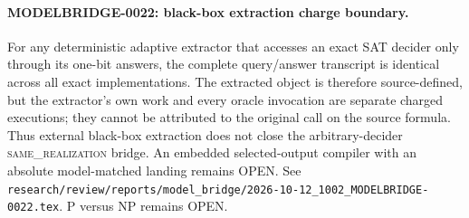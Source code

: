 \paragraph{MODELBRIDGE-0022: black-box extraction charge boundary.}
For any deterministic adaptive extractor that accesses an exact SAT decider
only through its one-bit answers, the complete query/answer transcript is
identical across all exact implementations.  The extracted object is therefore
source-defined, but the extractor's own work and every oracle invocation are
separate charged executions; they cannot be attributed to the original call
on the source formula.  Thus external black-box extraction does not close the
arbitrary-decider \textsc{same\_realization} bridge.  An embedded selected-output
compiler with an absolute model-matched landing remains OPEN.  See
\texttt{research/review/reports/model\_bridge/2026-10-12\_1002\_MODELBRIDGE-0022.tex}.
P versus NP remains OPEN.
